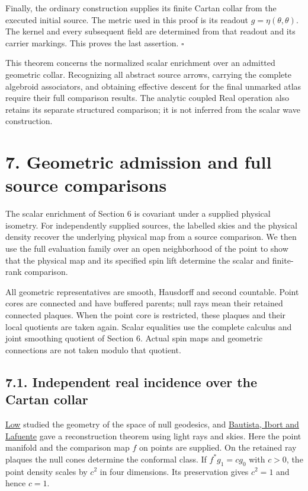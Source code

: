 \documentclass[
  english,
  11pt,
  reqno]{amsart}
\begin{document}
Finally, the ordinary construction supplies its finite Cartan collar
from the executed initial source. The metric used in this proof is its
readout \(g=\eta(\theta,\theta)\). The kernel and every subsequent field
are determined from that readout and its carrier markings. This proves
the last assertion. \hfill\(\square\)

This theorem concerns the normalized scalar enrichment over an admitted
geometric collar. Recognizing all abstract source arrows, carrying the
complete algebroid associators, and obtaining effective descent for the
final unmarked atlas require their full comparison results. The analytic
coupled Real operation also retains its separate structured comparison;
it is not inferred from the scalar wave construction.

\section{7. Geometric admission and full source
comparisons}\label{geometric-admission-and-full-source-comparisons}\label{sec:online-complete-source-comparisons}

The scalar enrichment of Section 6 is covariant under a supplied
physical isometry. For independently supplied sources, the labelled
skies and the physical density recover the underlying physical map from
a source comparison. We then use the full evaluation family over an open
neighborhood of the point to show that the physical map and its
specified spin lift determine the scalar and finite-rank comparison.

All geometric representatives are smooth, Hausdorff and second
countable. Point cores are connected and have buffered parents; null
rays mean their retained connected plaques. When the point core is
restricted, these plaques and their local quotients are taken again.
Scalar equalities use the complete calculus and joint smoothing quotient
of Section 6. Actual spin maps and geometric connections are not taken
modulo that quotient.

\subsection{7.1. Independent real incidence over the Cartan
collar}\label{independent-real-incidence-over-the-cartan-collar}\label{sec:online-actual-incidence-admission}

\hyperref[ref-Low2001]{Low} studied the geometry of the space of null
geodesics, and \hyperref[ref-BautistaIbortLafuente2014]{Bautista, Ibort
and Lafuente} gave a reconstruction theorem using light rays and skies.
Here the point manifold and the comparison map \(f\) on points are
supplied. On the retained ray plaques the null cones determine the
conformal class. If \(f^*g_1=cg_0\) with \(c>0\), the point density
scales by \(c^2\) in four dimensions. Its preservation gives \(c^2=1\)
and hence \(c=1\).
\end{document}
